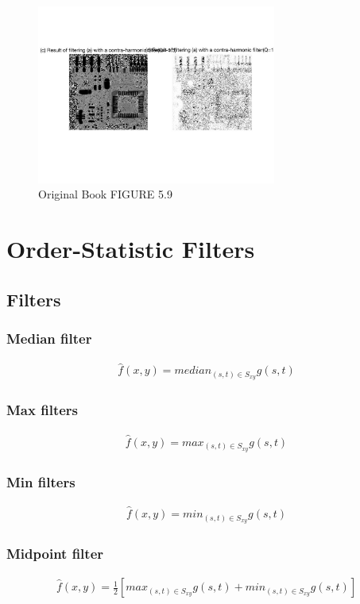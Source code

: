 \documentclass[11pt,oneside]{book}
\begin{document}
\begin{figure}[!htb]
   \centering  
   \includegraphics[width=0.7\textwidth]{images/4/mean3.jpg}
   \caption{Original Book FIGURE 5.9}
\end{figure}
\newpage

\section{Order-Statistic Filters}
\subsection{Filters}
\subsubsection{Median filter}
\begin{align}
\hat{f}(x,y) = {median}_{(s,t)\in S_{xy}}{g(s,t)}
\end{align}
\subsubsection{Max filters}
\begin{align}
\hat{f}(x,y) = {max}_{(s,t)\in S_{xy}}{g(s,t)}
\end{align}
\subsubsection{Min filters}
\begin{align}
\hat{f}(x,y) = {min}_{(s,t)\in S_{xy}}{g(s,t)}
\end{align}
\subsubsection{Midpoint filter}
\begin{align}
\hat{f}(x,y) = \frac{1}{2}[{max}_{(s,t)\in S_{xy}}{g(s,t)}+{min}_{(s,t)\in S_{xy}}{g(s,t)}]
\end{align}
\end{document}
